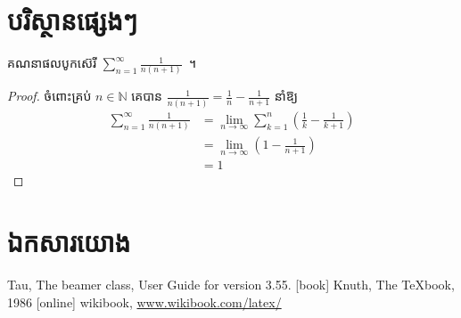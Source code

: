 \documentclass[serif]{beamer}
\begin{document}
\section{បរិស្ថានផ្សេងៗ}
\begin{frame}
    \begin{problem}
        គណនាផលបូកស៊េរី $ \sum_{n=1}^{\infty} \frac{1}{n(n+1)} $~។
    \end{problem}
    \begin{proof}
        ចំពោះគ្រប់ $ n\in\mathbb{N} $ គេបាន $ \frac{1}{n(n+1)}=\frac{1}{n}-\frac{1}{n+1} $ នាំឱ្យ
        \begin{align*}
        \sum_{n=1}^{\infty} \frac{1}{n(n+1)}
        &=\lim\limits_{n\to \infty} \sum_{k=1}^{n} \left( \frac{1}{k}-\frac{1}{k+1} \right)\\
        &=\lim\limits_{n\to \infty} \left( 1-\frac{1}{n+1} \right)\\
        &=1
        \end{align*}
    \end{proof}
\end{frame}
\section{ឯកសារយោង}
\begin{frame}
    \begin{thebibliography}{4}
         Tau, The beamer class,
        \newblock User Guide for version 3.55.
        [book]
         Knuth, The TeXbook, 1986
        [online]
         wikibook, \url{www.wikibook.com/latex/}
    \end{thebibliography}
\end{frame}
\end{document}
